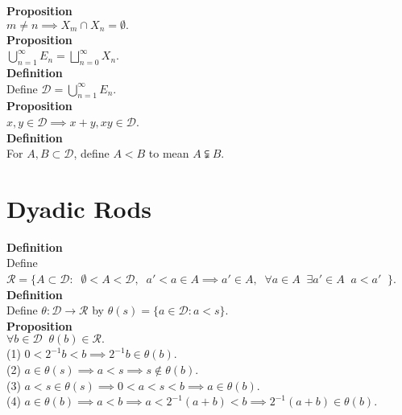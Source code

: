 \documentclass{article}
\newcommand{\targetset}{ \mathscr{R}}
\newcommand{\sourceset}{ \mathscr{D}}
\newcommand{\disjoints}{ X}
\newcommand{\nondisjoints}{E}
\newcommand{\homo}{\theta}
\newcommand{\elt}{a}
\newcommand{\homoelt}{b}
\newcommand{\altelt}{s}
\begin{document}
\textbf{Proposition}\\
$m \ne n \implies \disjoints_m \cap \disjoints_n = \emptyset.$\\

\textbf{Proposition}\\
$\bigcup_{n = 1}^\infty \nondisjoints_n =  \bigsqcup_{n= 0}^\infty \disjoints_n$.\\

\textbf{Definition}\\
Define $\sourceset = \bigcup_{n = 1}^\infty \nondisjoints_n$.\\

\textbf{Proposition}\\
$x,y \in \sourceset \implies  x+y,xy \in \sourceset$.\\


\textbf{Definition}\\
For $A,B \subset \sourceset$, define $A < B$ to mean $A \subsetneqq B $.\\

\section{Dyadic Rods}
\textbf{Definition}\\
Define $\targetset = \{A \subset \sourceset : \;\; \emptyset < A < \sourceset, \;\; a' < a \in A \implies a' \in A,\;\; \forall a \in A \;\; \exists a'  \in A \;\; a < a'\;\; \}$.\\

\textbf{Definition}\\
Define $\homo : \sourceset \to \targetset$ by $\homo(\altelt)  = \{ \elt \in \sourceset : \elt < \altelt \}$.\\

\textbf{Proposition}\\
$\forall \homoelt \in \sourceset \;\; \homo(\homoelt) \in \targetset.$\\

(1) $0 < 2^{-1}\homoelt < \homoelt \implies 2^{-1}\homoelt \in \homo(\homoelt)$.\\ 
(2) $\elt \in \homo(\altelt) \implies \elt < \altelt \implies \altelt \notin\homo(\homoelt)$.\\
(3) $\elt < \altelt \in \homo(\altelt) \implies 0 < \elt < \altelt < \homoelt \implies \elt \in \homo(\homoelt).$\\
(4) $\elt \in \homo(\homoelt) \implies \elt < \homoelt \implies \elt < 2^{-1}(\elt+ \homoelt) < \homoelt \implies 2^{-1}(\elt+ \homoelt) \in \homo(\homoelt)$.\\
\end{document}
